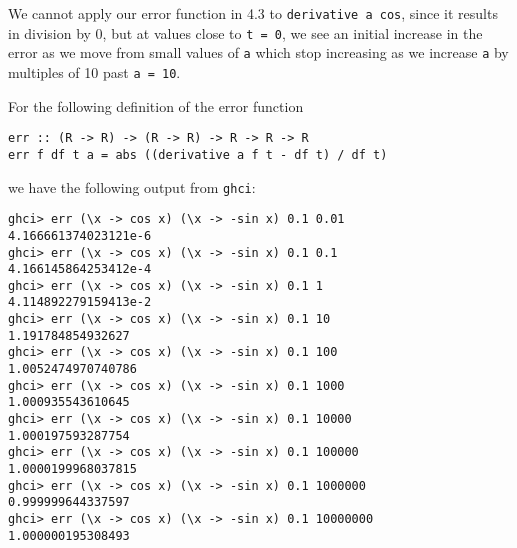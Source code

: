 
We cannot apply our error function in 4.3 to \verb|derivative a cos|, since it results in 
division by 0, but at values close to \verb|t = 0|, we see an initial increase in the error 
as we move from small values of \verb|a| which stop increasing as we increase \verb|a| by 
multiples of 10 past \verb|a = 10|.\par
\qquad For the following definition of the error function
\begin{verbatim}
err :: (R -> R) -> (R -> R) -> R -> R -> R
err f df t a = abs ((derivative a f t - df t) / df t)   
\end{verbatim}
we have the following output from \verb|ghci|:
\begin{verbatim}
ghci> err (\x -> cos x) (\x -> -sin x) 0.1 0.01
4.166661374023121e-6
ghci> err (\x -> cos x) (\x -> -sin x) 0.1 0.1
4.166145864253412e-4
ghci> err (\x -> cos x) (\x -> -sin x) 0.1 1
4.114892279159413e-2
ghci> err (\x -> cos x) (\x -> -sin x) 0.1 10
1.191784854932627
ghci> err (\x -> cos x) (\x -> -sin x) 0.1 100
1.0052474970740786
ghci> err (\x -> cos x) (\x -> -sin x) 0.1 1000
1.000935543610645
ghci> err (\x -> cos x) (\x -> -sin x) 0.1 10000
1.000197593287754
ghci> err (\x -> cos x) (\x -> -sin x) 0.1 100000
1.0000199968037815
ghci> err (\x -> cos x) (\x -> -sin x) 0.1 1000000
0.999999644337597
ghci> err (\x -> cos x) (\x -> -sin x) 0.1 10000000
1.000000195308493
\end{verbatim}

